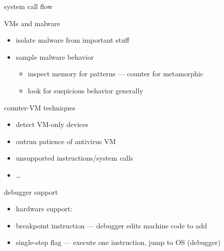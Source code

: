 \begin{frame}{system call flow}
\end{frame}

\begin{frame}{VMs and malware}
    \begin{itemize}
    \item isolate malware from important stuff
    \item sample malware behavior
        \begin{itemize}
        \item inspect memory for patterns --- counter for metamorphic
        \item look for suspicious behavior generally
        \end{itemize}
    \end{itemize}
\end{frame}

\begin{frame}{counter-VM techniques}
    \begin{itemize}
    \item detect VM-only devices
    \item outrun patience of antivirus VM
    \item unsupported instructions/system calls
    \item \ldots
    \end{itemize}
\end{frame}

\begin{frame}{debugger support}
    \begin{itemize}
    \item hardware support:
    \vspace{.5cm}
    \item breakpoint instruction --- debugger edits machine code to add
    \item single-step flag --- execute one instruction, jump to OS (debugger)
    \end{itemize}
\end{frame}

